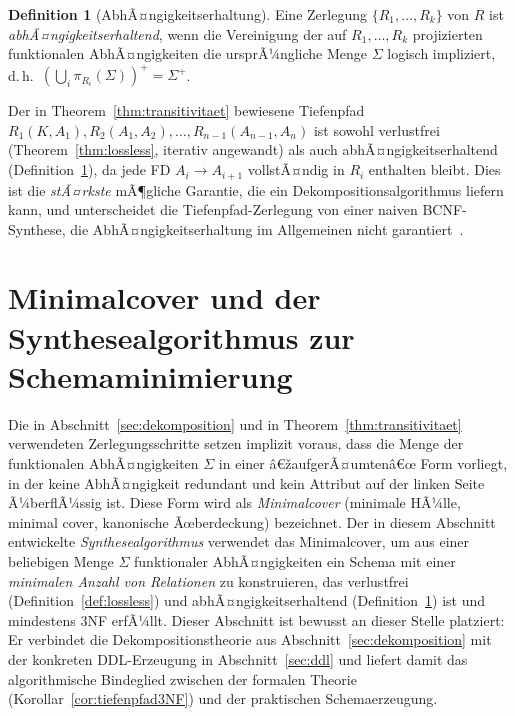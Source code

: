 ﻿\documentclass[a4paper,12pt]{report}
\theoremstyle{definition}
\newtheorem{definition}{Definition}[chapter]
\theoremstyle{remark}
\begin{document}
\begin{definition}[AbhÃ¤ngigkeitserhaltung]
\label{def:dep-erhaltend}
Eine Zerlegung $\{R_1,\ldots,R_k\}$ von $R$ ist
\emph{abhÃ¤ngigkeitserhaltend}, wenn die Vereinigung der auf $R_1,\ldots,
R_k$ projizierten funktionalen AbhÃ¤ngigkeiten die ursprÃ¼ngliche Menge
$\Sigma$ logisch impliziert, d.\,h.\ $(\bigcup_i \pi_{R_i}(\Sigma))^+ =
\Sigma^+$.
\end{definition}

Der in Theorem~\ref{thm:transitivitaet} bewiesene Tiefenpfad
$R_1(K,A_1), R_2(A_1,A_2),\ldots,R_{n-1}(A_{n-1},A_n)$ ist sowohl
verlustfrei (Theorem~\ref{thm:lossless}, iterativ angewandt) als auch
abhÃ¤ngigkeitserhaltend (Definition~\ref{def:dep-erhaltend}), da jede FD
$A_i \to A_{i+1}$ vollstÃ¤ndig in $R_i$ enthalten bleibt. Dies ist die
\emph{stÃ¤rkste} mÃ¶gliche Garantie, die ein Dekompositionsalgorithmus
liefern kann, und unterscheidet die Tiefenpfad-Zerlegung von einer
naiven BCNF-Synthese, die AbhÃ¤ngigkeitserhaltung im Allgemeinen nicht
garantiert~\cite{Ullman1988}.

\section{Minimalcover und der Synthesealgorithmus zur Schemaminimierung}
\label{sec:minimalcover}

Die in Abschnitt~\ref{sec:dekomposition} und in
Theorem~\ref{thm:transitivitaet} verwendeten Zerlegungsschritte setzen
implizit voraus, dass die Menge der funktionalen AbhÃ¤ngigkeiten
$\Sigma$ in einer â€žaufgerÃ¤umtenâ€œ Form vorliegt, in der keine
AbhÃ¤ngigkeit redundant und kein Attribut auf der linken Seite
Ã¼berflÃ¼ssig ist. Diese Form wird als \emph{Minimalcover}
(minimale HÃ¼lle, minimal cover, kanonische Ãœberdeckung) bezeichnet.
Der in diesem Abschnitt entwickelte \emph{Synthesealgorithmus}
verwendet das Minimalcover, um aus einer beliebigen Menge $\Sigma$
funktionaler AbhÃ¤ngigkeiten ein Schema mit einer
\emph{minimalen Anzahl von Relationen} zu konstruieren, das
verlustfrei (Definition~\ref{def:lossless}) und
abhÃ¤ngigkeitserhaltend (Definition~\ref{def:dep-erhaltend}) ist und
mindestens 3NF erfÃ¼llt. Dieser Abschnitt ist bewusst an dieser Stelle
platziert: Er verbindet die Dekompositionstheorie aus
Abschnitt~\ref{sec:dekomposition} mit der konkreten DDL-Erzeugung in
Abschnitt~\ref{sec:ddl} und liefert damit das algorithmische Bindeglied
zwischen der formalen Theorie (Korollar~\ref{cor:tiefenpfad3NF}) und
der praktischen Schemaerzeugung.
\end{document}
